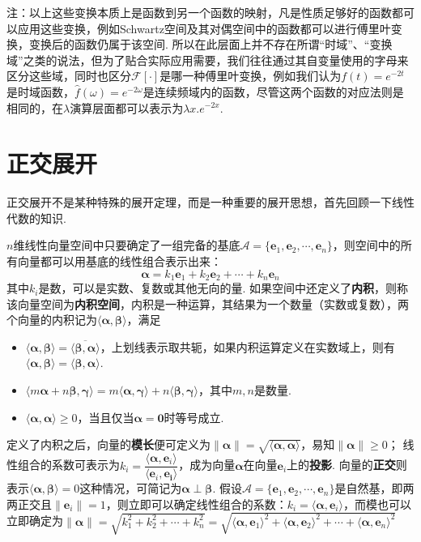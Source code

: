 注：以上这些变换本质上是函数到另一个函数的映射，凡是性质足够好的函数都可以应用这些变换，例如Schwartz空间及其对偶空间中的函数都可以进行傅里叶变换，变换后的函数仍属于该空间. 所以在此层面上并不存在所谓“时域”、“变换域”之类的说法，但为了贴合实际应用需要，我们往往通过其自变量使用的字母来区分这些域，同时也区分\(\mathcal{F}[\cdot]\)是哪一种傅里叶变换，例如我们认为\(f(t)=e^{-2t}\)是时域函数，\(\hat{f}(\omega)=e^{-2\omega}\)是连续频域内的函数，尽管这两个函数的对应法则是相同的，在\(\lambda\)演算层面都可以表示为\(\lambda x. e^{-2x}\).

\section{正交展开}

正交展开不是某种特殊的展开定理，而是一种重要的展开思想，首先回顾一下线性代数的知识.

\begin{reference}
    \(n\)维线性向量空间中只要确定了一组完备的基底\(\mathcal{A} = \{\bm{e}_1, \bm{e}_2, \cdots, \bm{e}_n\}\)，则空间中的所有向量都可以用基底的线性组合表示出来：
    \[\bm{\alpha} = k_1\bm{e}_1+k_2\bm{e}_2+\cdots+k_n\bm{e}_n\]
    其中\(k_i\)是数，可以是实数、复数或其他无向的量.
    \newline
    如果空间中还定义了\textbf{内积}，则称该向量空间为\textbf{内积空间}，内积是一种运算，其结果为一个数量（实数或复数），两个向量的内积记为\(\langle \bm{\alpha},\bm{\beta} \rangle\)，满足
    \begin{itemize}
        \item [(1)] \(\langle \bm{\alpha},\bm{\beta} \rangle = \overline{\langle \bm{\beta},\bm{\alpha} \rangle}\)，上划线表示取共轭，如果内积运算定义在实数域上，则有\(\langle \bm{\alpha},\bm{\beta} \rangle = \langle \bm{\beta},\bm{\alpha} \rangle\).
        \item [(2)] \(\langle m\bm{\alpha}+n\bm{\beta},\bm{\gamma} \rangle = m\langle \bm{\alpha},\bm{\gamma} \rangle + n\langle \bm{\beta},\bm{\gamma} \rangle\)，其中\(m,n\)是数量.
        \item [(3)] \(\langle \bm{\alpha},\bm{\alpha} \rangle \geq 0\)，当且仅当\(\bm{\alpha}=\bm{0}\)时等号成立.
    \end{itemize}
    定义了内积之后，向量的\textbf{模长}便可定义为\(\|\bm{\alpha}\|=\sqrt{\langle \bm{\alpha},\bm{\alpha} \rangle}\)，易知\(\|\bm{\alpha}\| \geq 0\)；
    \newline
    线性组合的系数可表示为\(k_i=\dfrac{\langle \bm{\alpha}, \bm{e}_i \rangle}{\langle \bm{e}_i, \bm{e_i} \rangle}\)，成为向量\(\bm{\alpha}\)在向量\(\bm{e}_i\)上的\textbf{投影}.
    \newline
    向量的\textbf{正交}则表示\(\langle \bm{\alpha},\bm{\beta} \rangle=0\)这种情况，可简记为\(\bm{\alpha} \perp \bm{\beta}\).
    \newline
    假设\(\mathcal{A}=\{\bm{e}_1, \bm{e}_2, \cdots, \bm{e}_n\}\)是自然基，即两两正交且\(\|\bm{e}_i\|=1\)，则立即可以确定线性组合的系数：\(k_i = \langle\bm{\alpha},\bm{e}_i\rangle\)，而模也可以立即确定为\(\|\bm{\alpha}\| = \sqrt{k_1^2+k_2^2+\cdots+k_n^2} = \sqrt{\langle\bm{\alpha},\bm{e}_1\rangle^2+\langle\bm{\alpha},\bm{e}_2\rangle^2+\cdots+\langle\bm{\alpha},\bm{e}_n\rangle^2}\)
\end{reference}

